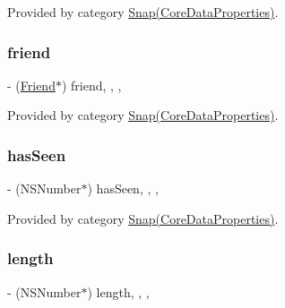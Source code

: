 Provided by category \hyperlink{category_snap_07_core_data_properties_08_a6691bfaebad4a5f85af2f2c81e182f73}{Snap(\+Core\+Data\+Properties)}.

\hypertarget{interface_snap_ad610ad587979481aa2ea6f6a917a0bfa}{}\label{interface_snap_ad610ad587979481aa2ea6f6a917a0bfa} 
\subsubsection{\texorpdfstring{friend}{friend}}
{\footnotesize\ttfamily -\/ (\hyperlink{interface_friend}{Friend}$\ast$) friend\hspace{0.3cm}{\ttfamily [read]}, {\ttfamily [write]}, {\ttfamily [nonatomic]}, {\ttfamily [retain]}}



Provided by category \hyperlink{category_snap_07_core_data_properties_08_ad610ad587979481aa2ea6f6a917a0bfa}{Snap(\+Core\+Data\+Properties)}.

\hypertarget{interface_snap_ad7829a84e4fcd6dfc59187e925abf540}{}\label{interface_snap_ad7829a84e4fcd6dfc59187e925abf540} 
\subsubsection{\texorpdfstring{has\+Seen}{hasSeen}}
{\footnotesize\ttfamily -\/ (N\+S\+Number$\ast$) has\+Seen\hspace{0.3cm}{\ttfamily [read]}, {\ttfamily [write]}, {\ttfamily [nonatomic]}, {\ttfamily [retain]}}



Provided by category \hyperlink{category_snap_07_core_data_properties_08_ad7829a84e4fcd6dfc59187e925abf540}{Snap(\+Core\+Data\+Properties)}.

\hypertarget{interface_snap_a71a054402e878feacaed0d6e41c70b74}{}\label{interface_snap_a71a054402e878feacaed0d6e41c70b74} 
\subsubsection{\texorpdfstring{length}{length}}
{\footnotesize\ttfamily -\/ (N\+S\+Number$\ast$) length\hspace{0.3cm}{\ttfamily [read]}, {\ttfamily [write]}, {\ttfamily [nonatomic]}, {\ttfamily [retain]}}



